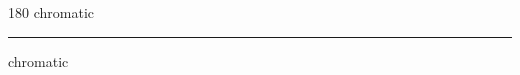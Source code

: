 
\begin{frame}
\begin{center}
\begin{turn}{180}
{\fontsize{2.5cm}{1em}\selectfont chromatic}
\end{turn}
\vspace{1em}\par  
\hrule
\vspace{1em}\par  
{\fontsize{2.5cm}{1em}\selectfont chromatic}
\end{center}
\end{frame}
